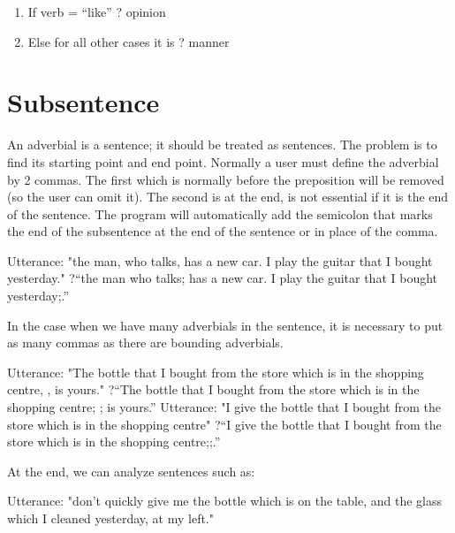 \documentclass[twoside,a4paper,10pt]{report}
\newcommand{\dokutitleleveltree}[1]{\section{#1}}
\newcommand{\dokuitem}{\item}
\begin{document}
\begin{enumerate}\dokuitem  If verb = “like” ? opinion
\dokuitem  Else for all other cases it is ? manner
\end{enumerate}

\dokutitleleveltree{Subsentence}
\label{60550ca08c44dda94b3d7a018a352868}%
An adverbial is a sentence; it should be treated as sentences. The problem is to find its starting point and end point.
Normally a user must define the adverbial by 2 commas. The first which is normally before the preposition will be removed (so the user can omit it). The second is at the end, is not essential if it is the end of the sentence. The program will automatically add the semicolon that marks the end of the subsentence at the end of the sentence or in place of the comma. 


\small
\begin{verbatimtab}
  Utterance: "the man, who talks, has a new car. I play the guitar that I bought yesterday."
  ?“the man who talks; has a new car. I play the guitar that I bought yesterday;.”
\end{verbatimtab}
\normalsize
In the case when we have many adverbials in the sentence, it is necessary to put as many commas as there are bounding adverbials.


\small
\begin{verbatimtab}
  Utterance: "The bottle that I bought from the store which is in the shopping centre, , is yours."
  ?“The bottle that I bought from the store which is in the shopping centre; ; is yours.”
  Utterance: "I give the bottle that I bought from the store which is in the shopping centre"
  ?“I give the bottle that I bought from the store which is in the shopping centre;;.” 
\end{verbatimtab}
\normalsize
At the end, we can analyze sentences such as:


\small
\begin{verbatimtab}
  Utterance: "don't quickly give me the bottle which is on the table, and the glass which I cleaned
yesterday, at my left."
\end{verbatimtab}
\normalsize
\end{document}
